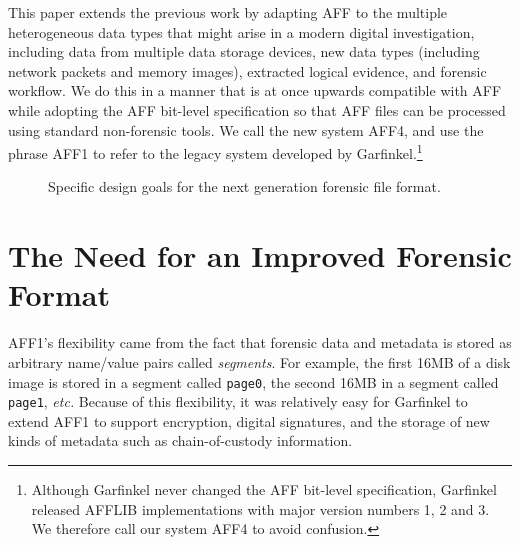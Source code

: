\documentclass[10pt, conference]{IEEEtran}
\begin{document}
This paper extends the previous work by adapting AFF to the multiple
heterogeneous data types that might arise in a modern digital
investigation, including data from multiple data storage devices, new
data types (including network packets and memory images), extracted
logical evidence, and forensic workflow. We do this in a manner that
is at once upwards compatible with AFF while adopting the AFF
bit-level specification so that AFF files can be processed using
standard non-forensic tools.  We call the new system AFF4, and use the
phrase AFF1 to refer to the legacy system developed by
Garfinkel.\footnote{Although Garfinkel never changed the AFF bit-level
specification, Garfinkel released AFFLIB implementations with major
version numbers 1, 2 and 3. We therefore call our system AFF4 to avoid confusion.}

\begin{figure}
\caption{Specific design goals for the next generation forensic file
  format.}
\end{figure}
\section{The Need for an Improved Forensic Format}

AFF1's flexibility came from the fact that forensic data and metadata
is stored as arbitrary name/value pairs called \emph{segments}. For
example, the first 16MB of a disk image is stored in a segment called
\texttt{page0}, the second 16MB in a segment called \texttt{page1},
\emph{etc.} Because of this flexibility, it was relatively easy for
Garfinkel to extend AFF1 to support encryption, digital signatures, and
the storage of new kinds of metadata such as chain-of-custody
information\cite{garfinkel:affcrypto}. 
\end{document}
